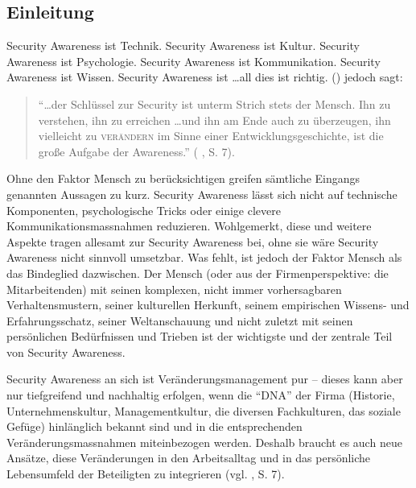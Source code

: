\documentclass[../../main.tex]{subfiles}
\begin{document}
\subsection{Einleitung}
\label{einleitung_grundlagen}

\begin{sloppypar}
Security Awareness ist Technik. Security Awareness ist Kultur. Security Awareness ist Psychologie. Security Awareness ist Kommunikation. Security Awareness ist Wissen. Security Awareness ist \dots all dies ist richtig. \citeauthor{helisch_security_2009} (\citeyear{helisch_security_2009}) jedoch sagt:

\begin{quote}
"`\dots der Schlüssel zur Security ist unterm Strich stets der Mensch. Ihn zu verstehen, ihn zu erreichen \dots und ihn am Ende auch zu überzeugen, ihn vielleicht zu \textsc{verändern} im Sinne einer Entwicklungsgeschichte, ist die gro\ss e Aufgabe der Awareness."' (\citeauthor{helisch_security_2009} \citeyear{helisch_security_2009}, S. 7).
\end{quote}

Ohne den Faktor Mensch zu berücksichtigen greifen sämtliche Eingangs genannten Aussagen zu kurz. Security Awareness lässt sich nicht auf  technische Komponenten, psychologische Tricks oder einige clevere Kommunikationsmassnahmen reduzieren. Wohlgemerkt, diese und weitere Aspekte tragen allesamt zur Security Awareness bei, ohne sie wäre Security Awareness nicht sinnvoll umsetzbar. Was fehlt, ist jedoch der Faktor Mensch als das Bindeglied dazwischen. Der Mensch (oder aus der Firmenperspektive: die Mitarbeitenden) mit seinen komplexen, nicht immer vorhersagbaren Verhaltensmustern, seiner kulturellen Herkunft, seinem empirischen Wissens- und Erfahrungsschatz, seiner Weltanschauung und nicht zuletzt mit seinen persönlichen Bedürfnissen und Trieben ist der wichtigste und der zentrale Teil von Security Awareness.

Security Awareness an sich ist Veränderungsmanagement pur -- dieses kann aber nur tiefgreifend und nachhaltig erfolgen, wenn die "`DNA"' der Firma (Historie, Unternehmenskultur, Managementkultur, die diversen Fachkulturen, das soziale Gefüge) hinlänglich bekannt sind und in die entsprechenden Veränderungsmassnahmen miteinbezogen werden. Deshalb braucht es auch neue Ansätze, diese Veränderungen in den Arbeitsalltag und in das persönliche Lebensumfeld der Beteiligten zu integrieren (vgl. \citeauthor{helisch_security_2009} \citeyear{helisch_security_2009}, S. 7).
\end{sloppypar}
\end{document}
